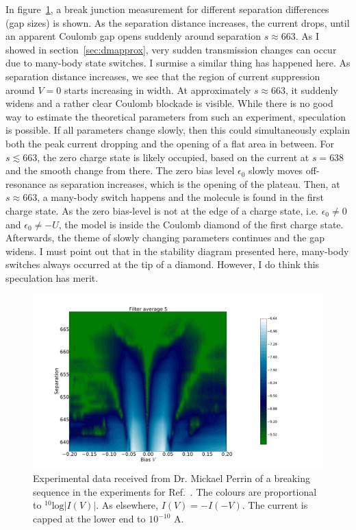 In figure~\ref{fig:perrindata}, a break junction measurement for different separation differences (gap sizes) is shown. As the separation distance increases, the current drops, until an apparent Coulomb gap opens suddenly around separation $s \approx 663$. As I showed in section~\ref{sec:dmapprox}, very sudden transmission changes can occur due to many-body state switches. I surmise a similar thing has happened here. As separation distance increases, we see that the region of current suppression around $V=0$ starts increasing in width. At approximately $s\approx 663$, it suddenly widens and a rather clear Coulomb blockade is visible. While there is no good way to estimate the theoretical parameters from such an experiment, speculation is possible. If all parameters change slowly, then this could simultaneously explain both the peak current dropping and the opening of a flat area in between. For $s \lesssim 663$, the zero charge state is likely occupied, based on the current at $s = 638$ and the smooth change from there. The zero bias level $\epsilon_0$ slowly moves off-resonance as separation increases, which is the opening of the plateau. Then, at $s \approx 663$, a many-body switch happens and the molecule is found in the first charge state. As the zero bias-level is not at the edge of a charge state, i.e. $\epsilon_0 \neq 0 $ and $\epsilon_0 \neq -U$, the model is inside the Coulomb diamond of the first charge state. Afterwards, the theme of slowly changing parameters continues and the gap widens. I must point out that in the stability diagram presented here, many-body switches always occurred at the tip of a diamond. However, I do think this speculation has merit.
\begin{figure}[htb]
    \centering
    \includegraphics[width=.99\textwidth,clip=true, trim=4cm 0cm 10cm 4cm]{pdf/perrin_experiment_abs.pdf}
    \caption{Experimental data received from Dr. Mickael Perrin of a breaking sequence in the experiments for Ref.~\citet{perrinnano}. The colours are proportional to $^{10}\text{log}\left|I(V)\right|$. As elsewhere, $I(V) = -I(-V)$. The current is capped at the lower end to $10^{-10}$ A.}
    \label{fig:perrindata}
\end{figure}

